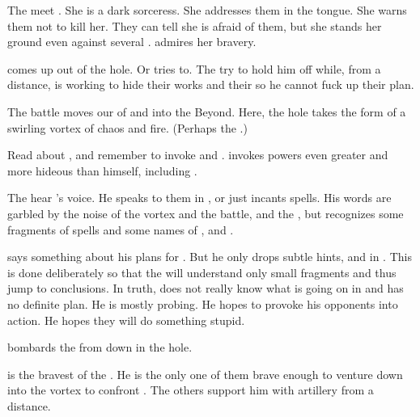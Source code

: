 \begin{changes}
    \begin{comment}
      \subparagraph{\Resphain meet \Criseis}
    \end{comment}
    The \resphain meet \Criseis.
    She is a dark sorceress. 
    She addresses them in the \Resphan tongue. 
    She warns them not to kill her.
    They can tell she is afraid of them, but she stands her ground even against several \resphain.
    \Teshrial admires her bravery. 
    
    \begin{comment}
      \subparagraph{\Ishnaruchaefir arrives}
    \end{comment}
    
    \Ishnaruchaefir comes up out of the hole. 
    Or tries to.
    The \resphain try to hold him off while, from a distance, \Urizeth is working to hide their works and their \noggyaleth so he cannot fuck up their plan. 
    
    The battle moves our of \Azmith and into the Beyond.
    Here, the hole takes the form of a swirling vortex of chaos and fire. 
    (Perhaps the .)

    Read about , and remember to invoke \Sethicus and \Tiamat. 
    \Ishnaruchaefir invokes powers even greater and more hideous than himself, including \xss. 
    
    The \resphain hear \Ishnaruchaefir's voice.
    He speaks to them in \TrueDraconic, or just incants spells. 
    His words are garbled by the noise of the vortex and the battle, and the \resphain {}, but \Teshrial recognizes some fragments of spells and some names of \xss, \Sethicus and \Tiamat. 
    
    \Ishnaruchaefir says something about his plans for \Malcur.
    But he only drops subtle hints, and in \TrueDraconic.
    This is done deliberately so that the \resphain will understand only small fragments and thus jump to conclusions.
    In truth, \Ishnaruchaefir does not really know what is going on in \Malcur and has no definite plan.
    He is mostly probing.
    He hopes to provoke his opponents into action.
    He hopes they will do something stupid. 
    
    \Ishnaruchaefir bombards the \resphain from down in the hole. 
    
    \Teshrial is the bravest of the \resphain. 
    He is the only one of them brave enough to venture down into the vortex to confront \Ishnaruchaefir. 
    The others support him with artillery from a distance. 
    

\end{changes}
